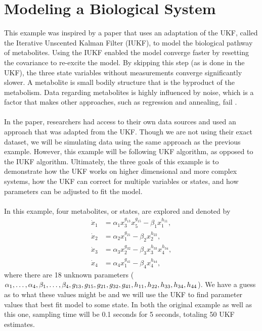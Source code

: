 \section{Modeling a Biological System }
\label{Modeling a Biological System }

This example was inspired by a paper that uses an adaptation of the UKF, called the Iterative Unscented Kalman Filter (IUKF), to model the biological pathway of metabolites. Using the IUKF enabled the model converge faster by resetting the covariance to re-excite the model. By skipping this step (as is done in the UKF), the three state variables without measurements converge significantly slower. A metabolite is small bodily structure that is the byproduct of the metabolism. Data regarding metabolites is highly influenced by noise, which is a factor that makes other approaches, such as regression and annealing, fail \cite{article5}. \\ \\

\noindent In the paper, researchers had access to their own data sources and used an approach that was adapted from the UKF. Though we are not using their exact dataset, we will be simulating data using the same approach as the previous example. However, this example will be following UKF algorithm, as opposed to the IUKF algorithm. Ultimately, the three goals of this example is to demonstrate how the UKF works on higher dimensional and more complex systems, how the UKF can correct for multiple variables or states, and how parameters can be adjusted to fit the model. \\ \\

\noindent In this example, four metabolites, or states, are explored and denoted by
\begin{align*}
\dot x_1 &= \alpha_1 x_3^{g_{13}} x_5^{g_{15}} - \beta_1 x_1^{h_{11}}, \\
\dot x_2 &= \alpha_2 x_1^{g_{21}} - \beta_2 x_2^{h_{22}}, \\
\dot x_3 &= \alpha_3 x_2^{g_{32}} - \beta_3 x_3^{h_{33}} x_4^{h_{34}}, \\
\dot x_4 &= \alpha_4  x_1^{g_{41}} - \beta_4 x_4^{h_{44}},
\end{align*}
where there are 18 unknown parameters ($\alpha_1, \hdots, \alpha_4, \beta_1, \hdots, \beta_4, g_{13}, g_{15}, g_{21}, \\ g_{32}, g_{41}, h_{11}, h_{22}, h_{33}, h_{34}, h_{44} $). We have a guess as to what these values might be and we will use the UKF to find parameter values that best fit model to some state. In both the original example as well as this one, sampling time will be 0.1 seconds for 5 seconds, totaling 50 UKF estimates. \\ \\

